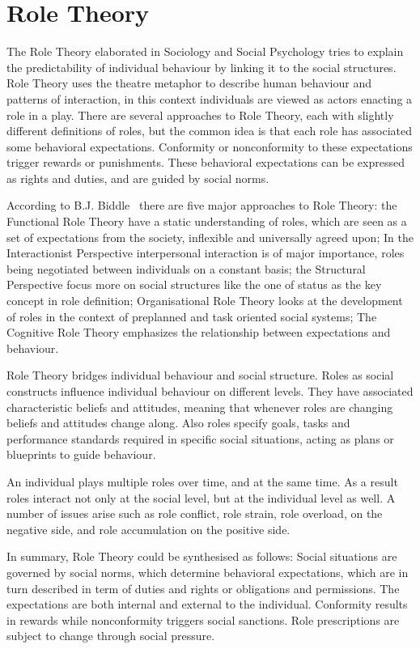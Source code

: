 \documentclass[a4paper,12pt,oneside,fleqn]{book} %
\theoremstyle{plain}
\theoremstyle{definition}
\theoremstyle{remark}
\begin{document}
\section{Role Theory} %

The Role Theory elaborated in Sociology and Social Psychology tries to
explain the predictability of individual behaviour by linking it to the
social structures. Role Theory uses the theatre metaphor to describe human
behaviour and patterns of interaction, in this context individuals are
viewed as actors enacting a role in a play. There are several approaches to
Role Theory, each with slightly different definitions of roles, but the
common idea is that each role has associated some behavioral expectations.
Conformity or nonconformity to these expectations trigger rewards or
punishments. These behavioral expectations can be expressed as rights and
duties, and are guided by social norms.

According to B.J. Biddle~\cite{} there are five major approaches to Role
Theory: the Functional Role Theory have a static understanding of roles,
which are seen as a set of expectations from the society, inflexible and
universally agreed upon; In the Interactionist Perspective interpersonal
interaction is of major importance, roles being negotiated between
individuals on a constant basis; the Structural Perspective focus more on
social structures like the one of status as the key concept in role
definition; Organisational Role Theory looks at the development of roles in
the context of preplanned and task oriented social systems; The Cognitive
Role Theory emphasizes the relationship between expectations and behaviour.

Role Theory bridges individual behaviour and social structure. Roles as
social constructs influence individual behaviour on different levels. They
have associated characteristic beliefs and attitudes, meaning that whenever
roles are changing beliefs and attitudes change along. Also roles specify
goals, tasks and performance standards required in specific social
situations, acting as plans or blueprints to guide behaviour.

An individual plays multiple roles over time, and at the same time. As a
result roles interact not only at the social level, but at the individual
level as well. A number of issues arise such as role conflict, role strain,
role overload, on the negative side, and role accumulation on the positive
side.

In summary, Role Theory could be synthesised as follows: Social situations
are governed by social norms, which determine behavioral expectations,
which are in turn described in term of duties and rights or obligations and
permissions. The expectations are both internal and external to the
individual. Conformity results in rewards while nonconformity triggers
social sanctions. Role prescriptions are subject to change through social
pressure.
\end{document}
